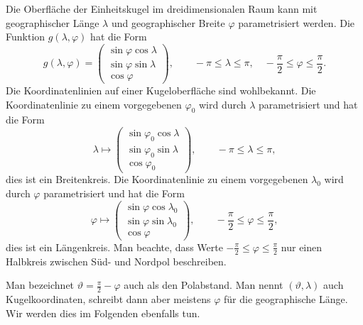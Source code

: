 \begin{beispiel}
Die Oberfläche der Einheitskugel im dreidimensionalen Raum kann mit
geographischer Länge $\lambda$ und geographischer Breite $\varphi$
parametrisiert werden.
%
%
%
%
%
Die Funktion $g(\lambda,\varphi)$ hat die Form
\begin{equation}
g(\lambda,\varphi)
=
\begin{pmatrix}
\sin\varphi\cos\lambda\\
\sin\varphi\sin\lambda\\
\cos\varphi
\end{pmatrix},\qquad
-\pi \le \lambda \le \pi,\quad
-\frac{\pi}2 \le \varphi \le \frac{\pi}2
.
\end{equation}
%
Die Koordinatenlinien auf einer Kugeloberfläche sind wohlbekannt. 
Die Koordinatenlinie zu einem vorgegebenen $\varphi_0$ wird durch
$\lambda$ parametrisiert und hat die Form
\[
\lambda
\mapsto
\begin{pmatrix}
\sin\varphi_0\cos\lambda\\
\sin\varphi_0\sin\lambda\\
\cos\varphi_0
\end{pmatrix},\qquad -\pi\le\lambda\le\pi,
\]
dies ist ein Breitenkreis.
%
Die Koordinatenlinie zu einem vorgegebenen $\lambda_0$ wird durch
$\varphi$ parametrisiert und hat die Form
\[
\varphi
\mapsto
\begin{pmatrix}
\sin\varphi\cos\lambda_0\\
\sin\varphi\sin\lambda_0\\
\cos\varphi
\end{pmatrix},\qquad -\frac{\pi}2 \le \varphi\le \frac{\pi}2,
\]
dies ist ein Längenkreis.
%
Man beachte, dass Werte $-\frac{\pi}2\le \varphi \le \frac{\pi}2$ nur einen
Halbkreis zwischen Süd- und Nordpol beschreiben.

Man bezeichnet $\vartheta = \frac{\pi}2-\varphi$ auch als den
Polabstand.
Man nennt $(\vartheta,\lambda)$ auch Kugelkoordinaten, schreibt
dann aber meistens $\varphi$ für die geographische Länge.
Wir werden dies im Folgenden ebenfalls tun.
\end{beispiel}

